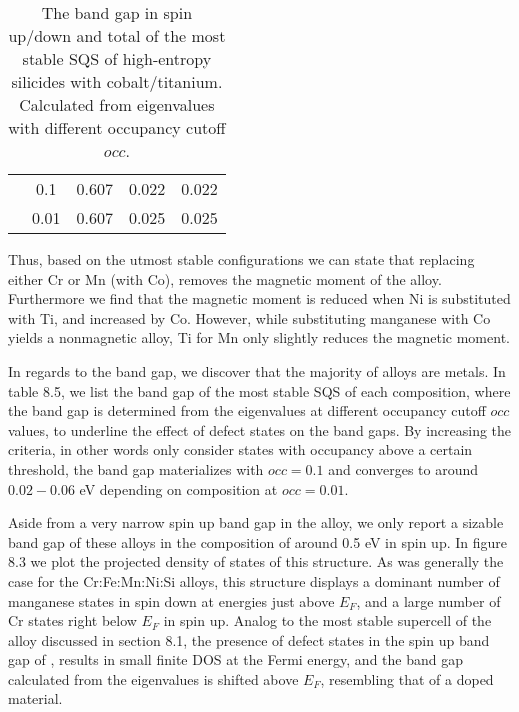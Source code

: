 \begin{table}[H]
\begin{tabular}{@{}ccccc@{}}
\multicolumn{1}{c|}{}                             & \multicolumn{1}{c|}{0.1}  & 0.607                                                                         & 0.022                                                                        & 0.022                                                                         \\
\multicolumn{1}{c|}{}                             & \multicolumn{1}{c|}{0.01}                      & 0.607                                                                         & 0.025                                                                        & 0.025                                                                         \\ \bottomrule
\end{tabular}
\caption{The band gap in spin up/down and total of the most stable SQS of high-entropy silicides with cobalt/titanium. Calculated from eigenvalues with different occupancy cutoff $occ$. }
\end{table}

Thus, based on the utmost stable configurations we can state that replacing either Cr or Mn (with Co), removes the magnetic moment of the alloy. Furthermore we find that the magnetic moment is reduced when Ni is substituted with Ti, and increased by Co. However, while substituting manganese with Co yields a nonmagnetic alloy, Ti for Mn only slightly reduces the magnetic moment. 

In regards to the band gap, we discover that the majority of alloys are metals. In table 8.5, we list the band gap of the most stable SQS of each composition, where the band gap is determined from the eigenvalues at different occupancy cutoff $occ$ values, to underline the effect of defect states on the band gaps. By increasing the criteria, in other words only consider states with occupancy above a certain threshold, the band gap materializes with $occ = 0.1$ and converges to around $0.02 - 0.06$ eV depending on composition at $occ = 0.01$.
 
Aside from a very narrow spin up band gap in the  alloy, we only report a sizable band gap of these alloys in the  composition of around 0.5 eV in spin up. In figure 8.3 we plot the projected density of states of this structure. As was generally the case for the Cr:Fe:Mn:Ni:Si alloys, this structure displays a dominant number of manganese states in spin down at energies just above $E_F$, and a large number of Cr states right below $E_F$ in spin up. Analog to the most stable supercell of the  alloy discussed in section 8.1, the presence of defect states in the spin up band gap of , results in small finite DOS at the Fermi energy, and the band gap calculated from the eigenvalues is shifted above $E_F$, resembling that of a doped material.  
  

